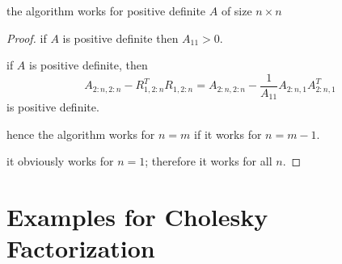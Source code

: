 \begin{proposition}
    the algorithm works for positive definite $ A $ of size $ n \times n $
\end{proposition}

\begin{proof}
    if $ A $ is positive definite then $ A_{11}>0 $.

    if $ A $ is positive definite, then
$$
A_{2: n, 2: n}-R_{1,2: n}^{T} R_{1,2: n}=A_{2: n, 2: n}-\frac{1}{A_{11}} A_{2: n, 1} A_{2: n, 1}^{T}
$$
is positive definite.

hence the algorithm works for $ n=m $ if it works for $ n=m-1 $.

it obviously works for $ n=1 $; therefore it works for all $ n $.
\end{proof}


\section{Examples for Cholesky Factorization}

